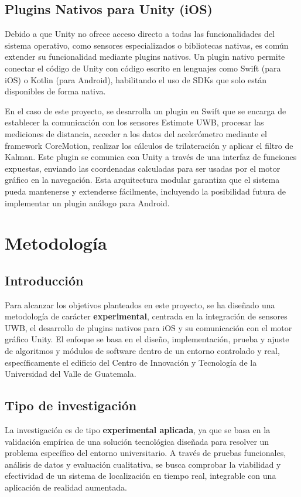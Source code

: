 \documentclass{article}
\begin{document}
\subsection{Plugins Nativos para Unity (iOS)}
{\justify Debido a que Unity no ofrece acceso directo a todas las funcionalidades del sistema operativo, como sensores especializados o bibliotecas nativas, es común extender su funcionalidad mediante plugins nativos. Un plugin nativo permite conectar el código de Unity con código escrito en lenguajes como Swift (para iOS) o Kotlin (para Android), habilitando el uso de SDKs que solo están disponibles de forma nativa.

En el caso de este proyecto, se desarrolla un plugin en Swift que se encarga de establecer la comunicación con los sensores Estimote UWB, procesar las mediciones de distancia, acceder a los datos del acelerómetro mediante el framework CoreMotion, realizar los cálculos de trilateración y aplicar el filtro de Kalman. Este plugin se comunica con Unity a través de una interfaz de funciones expuestas, enviando las coordenadas calculadas para ser usadas por el motor gráfico en la navegación. Esta arquitectura modular garantiza que el sistema pueda mantenerse y extenderse fácilmente, incluyendo la posibilidad futura de implementar un plugin análogo para Android.}


\section{Metodología}
\subsection{Introducción}


Para alcanzar los objetivos planteados en este proyecto, se ha diseñado una metodología de carácter \textbf{experimental}, centrada en la integración de sensores UWB, el desarrollo de plugins nativos para iOS y su comunicación con el motor gráfico Unity. El enfoque se basa en el diseño, implementación, prueba y ajuste de algoritmos y módulos de software dentro de un entorno controlado y real, específicamente el edificio del Centro de Innovación y Tecnología de la Universidad del Valle de Guatemala.

\subsection{Tipo de investigación}

La investigación es de tipo \textbf{experimental aplicada}, ya que se basa en la validación empírica de una solución tecnológica diseñada para resolver un problema específico del entorno universitario. A través de pruebas funcionales, análisis de datos y evaluación cualitativa, se busca comprobar la viabilidad y efectividad de un sistema de localización en tiempo real, integrable con una aplicación de realidad aumentada.
\end{document}
